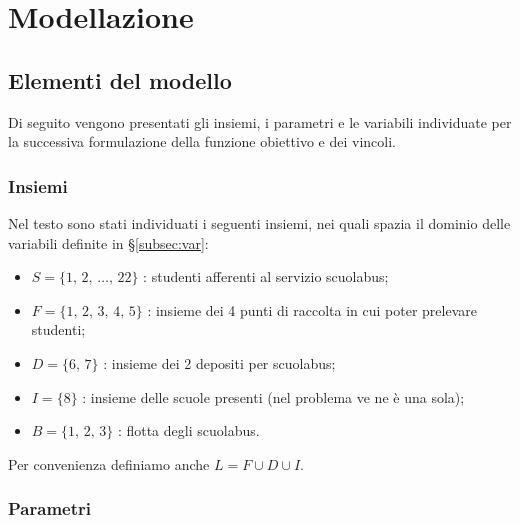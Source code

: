 
\chapter{Modellazione}

\ifpdf
    \graphicspath{{Chapter3/Figs/Raster/}{Chapter3/Figs/PDF/}{Chapter3/Figs/}}
\else
    \graphicspath{{Chapter3/Figs/Vector/}{Chapter3/Figs/}}
\fi
\section{Elementi del modello}
Di seguito vengono presentati gli insiemi, i parametri e le variabili individuate per la successiva formulazione della funzione obiettivo e dei vincoli.
\subsection{Insiemi}
Nel testo sono stati individuati i seguenti insiemi, nei quali spazia il dominio delle variabili definite in §\ref{subsec:var}:
\begin{itemize}
  \item $S = \{1,\, 2,\, \ldots,\, 22\}$ : studenti afferenti al servizio scuolabus;%
  \item $F = \{1,\, 2,\, 3,\, 4,\, 5\}$ : insieme dei 4 punti di raccolta in cui poter prelevare studenti;
  \item $D = \{6,\, 7\}$ : insieme dei 2 depositi per scuolabus;
  \item $I = \{8\}$ : insieme delle scuole presenti (nel problema ve ne è una sola);
  \item $B = \{1,\,2,\,3\}$ : flotta degli scuolabus.
\end{itemize}
Per convenienza definiamo anche $L = F \cup D \cup I$.

\subsection{Parametri}

